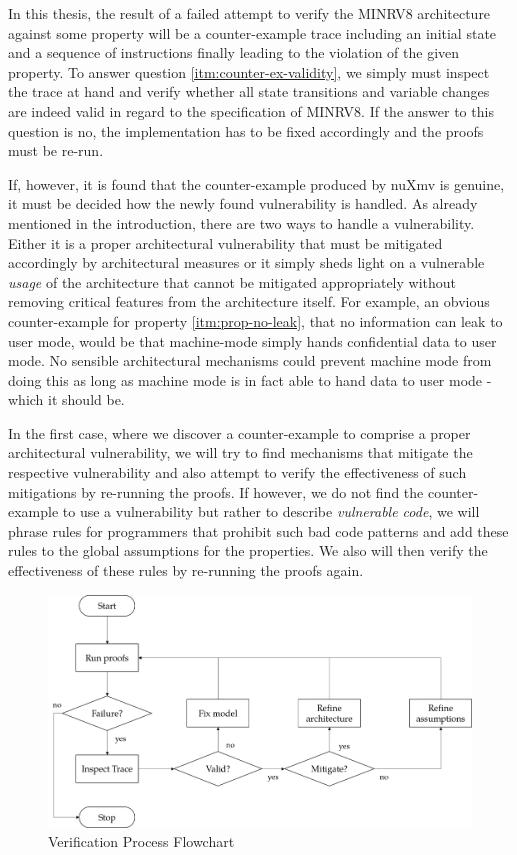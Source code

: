In this thesis, the result of a failed attempt to verify the MINRV8 architecture against some property will be a counter-example trace including an initial state and a sequence of instructions finally leading to the violation of the given property.
To answer question \ref{itm:counter-ex-validity}, we simply must inspect the trace at hand and verify whether all state transitions and variable changes are indeed valid in regard to the specification of MINRV8.
If the answer to this question is no, the implementation has to be fixed accordingly and the proofs must be re-run.

If, however, it is found that the counter-example produced by nuXmv is genuine, it must be decided how the newly found vulnerability is handled.
As already mentioned in the introduction, there are two ways to handle a vulnerability.
Either it is a proper architectural vulnerability that must be mitigated accordingly by architectural measures or it simply sheds light on a vulnerable \textit{usage} of the architecture that cannot be mitigated appropriately without removing critical features from the architecture itself.
For example, an obvious counter-example for property \ref{itm:prop-no-leak}, that no information can leak to user mode, would be that machine-mode simply hands confidential data to user mode.
No sensible architectural mechanisms could prevent machine mode from doing this as long as machine mode is in fact able to hand data to user mode - which it should be.

In the first case, where we discover a counter-example to comprise a proper architectural vulnerability, we will try to find mechanisms that mitigate the respective vulnerability and also attempt to verify the effectiveness of such mitigations by re-running the proofs.
If however, we do not find the counter-example to use a vulnerability but rather to describe \textit{vulnerable code}, we will phrase rules for programmers that prohibit such bad code patterns and add these rules to the global assumptions for the properties.
We also will then verify the effectiveness of these rules by re-running the proofs again.

\begin{figure}
    \centering
    \includegraphics[width=\textwidth]{figures/verfification-process.png}
    \caption{Verification Process Flowchart}
    \label{fig:ver-process}
\end{figure}

